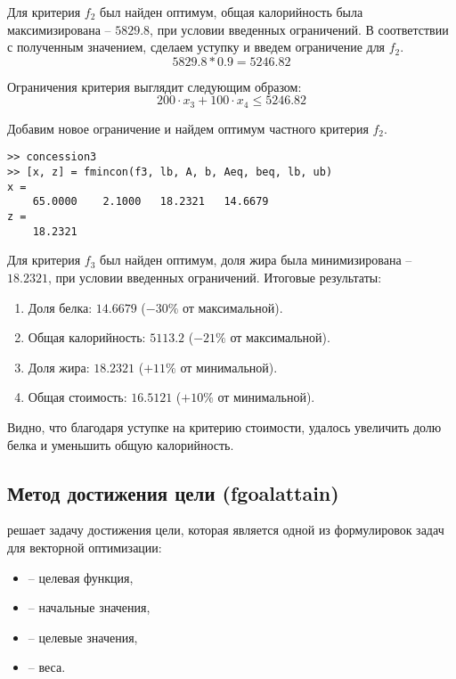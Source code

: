 Для критерия $f_2$ был найден оптимум, общая калорийность была максимизирована -- $5829.8$, при условии введенных ограничений. В соответствии с полученным значением, сделаем уступку и введем ограничение для $f_2$.
$$
5829.8 * 0.9 = 5246.82
$$

Ограничения критерия выглядит следующим образом:
$$
200 \cdot x_3 + 100 \cdot x_4 \leq 5246.82
$$

Добавим новое ограничение и найдем оптимум частного критерия $f_2$.



\begin{lstlisting}[caption=\code{Console}]
>> concession3
>> [x, z] = fmincon(f3, lb, A, b, Aeq, beq, lb, ub)
x =
	65.0000    2.1000   18.2321   14.6679
z =
	18.2321
\end{lstlisting}

Для критерия $f_3$ был найден оптимум, доля жира была минимизирована -- $18.2321$, при условии введенных ограничений. Итоговые результаты:

\begin{enumerate}
	\item Доля белка: $14.6679$ ($-30\%$ от максимальной).
	\item Общая калорийность: $5113.2$ ($-21\%$ от максимальной).
	\item Доля жира: $18.2321$ ($+11\%$ от минимальной).
	\item Общая стоимость: $16.5121$ ($+10\%$ от минимальной).
\end{enumerate}

Видно, что благодаря уступке на критерию стоимости, удалось увеличить долю белка и уменьшить общую калорийность.

\subsection{Метод достижения цели (fgoalattain)}

 решает задачу достижения цели, которая является одной из формулировок
задач для векторной оптимизации: 

\noindent {}

\begin{itemize}
	\item {} -- целевая функция,
	\item {} -- начальные значения,
	\item {} -- целевые значения,
	\item {} -- веса.
\end{itemize}

